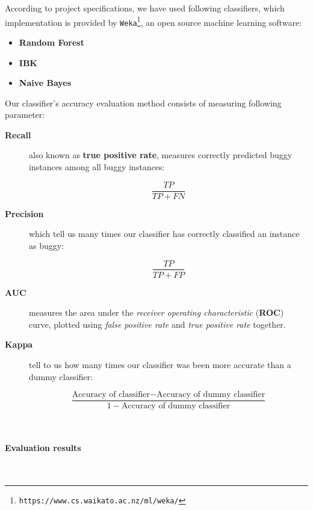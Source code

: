 \documentclass[sigconf]{acmart}
\begin{document}
According to project specifications, we have used following classifiers, which implementation is provided by \texttt{Weka}\footnote{\texttt{https://www.cs.waikato.ac.nz/ml/weka/}}, an open source machine learning software:
\begin{itemize}
\item \textbf{Random Forest}
\item \textbf{IBK}
\item \textbf{Naive Bayes}
\end{itemize}

Our classifier's accuracy evaluation method consists of measuring following parameter:

\begin{description}

\item[\textbf{Recall}] also known as \textbf{true positive rate}, measures correctly predicted buggy instances among all buggy instances:

\begin{equation}
\dfrac{TP}{TP + FN}
\end{equation}

\item[\textbf{Precision}] which tell us many times our classifier has correctly classified an instance as buggy:

\begin{equation}
\dfrac{TP}{TP + FP}
\end{equation}

\item[\textbf{AUC}] measures the area under the \textit{receiver operating characteristic} (\textbf{ROC}) curve, plotted using \textit{false positive rate} and \textit{true positive rate} together.

\item[\textbf{Kappa}] tell to us how many times our classifier was been more accurate than a dummy classifier:

\begin{equation}
\dfrac{\text{Accuracy of classifier} - \text{Accuracy of dummy classifier}}{1 - \text{Accuracy of dummy classifier}}
\end{equation}

\end{description}
\hfill\\
\paragraph{Evaluation results}
\hfill\\
\end{document}
